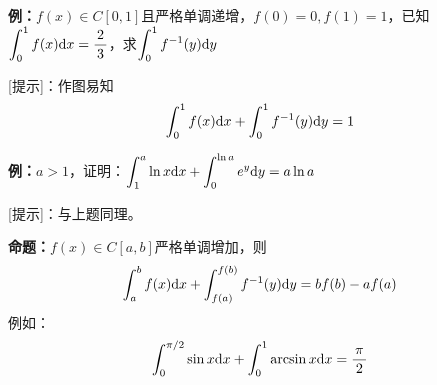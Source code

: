 \begin{shaded}

{\bf 例：}$f(x)\in C[0,1]$且严格单调递增，$f(0)=0,f(1)=1$，已知
$\dint_0^1f(x)\d x=\df23$，求$\dint_0^1f^{-1}(y)\d y$

[提示]：作图易知
$$\dint_0^1f(x)\d x+\dint_0^1f^{-1}(y)\d y=1$$

\begin{center}
\end{center}

{\bf 例：}$a>1$，证明：$\dint_1^a\ln x\d x+\dint_0^{\ln a}e^y\d y=a\ln a$

[提示]：与上题同理。

{\bf 命题：}$f(x)\in C[a,b]$严格单调增加，则
$$\dint_a^bf(x)\d x+\dint_{f(a)}^{f(b)}f^{-1}(y)\d y=bf(b)-af(a)$$
例如：
$$\dint_0^{\pi/2}\sin x\d x+\dint_0^1\arcsin x\d x=\df{\pi}2$$
\begin{center}
\end{center}


\end{shaded}
